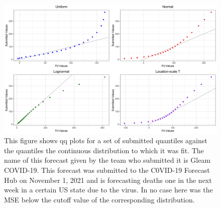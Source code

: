 \documentclass[11pt,notitlepage]{isuthesis}
\begin{document}
\begin{figure}[htbp]
\centerline{\includegraphics[scale=.15]{Images/qq_gleam_110121_1wkincdeath_st16.png}}
\begin{center}
\begin{minipage}{10cm}
\captionsetup{font=scriptsize}
\caption[QQ plot for quantile fit]{This figure shows qq plots for a set of
submitted quantiles against the quantiles the continuous distribution to which
it was fit. 
The name of this forecast given by the team who submitted it is Gleam COVID-19.
This forecast was submitted to the C0VID-19 Forecast Hub on November 1, 2021
and is forecasting deaths one in the next week in a certain US state due to the
virus.
In no case here was the MSE below the cutoff value of the 
corresponding distribution.}
\label{fig:qqfits}
\end{minipage}
\end{center}
\end{figure}
\end{document}
